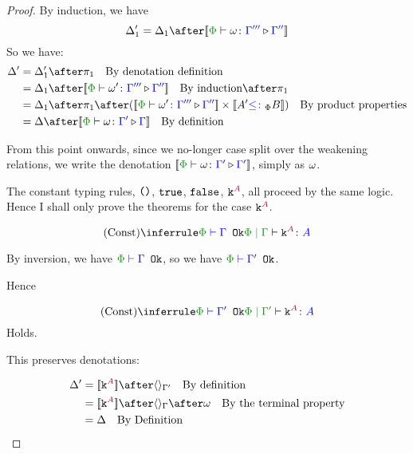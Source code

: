 \documentclass{report}
\begin{document}
\begin{framed}
\begin{proof}
                By induction, we have
                \begin{equation}
                    \D_1' = \D_1 \after \deno{\ewrel{\P}{\w}{\G'''}{\G''}}
                \end{equation}
                So we have:
                \begin{align*}
                    \D' &= \D_1' \after \p\qt{By denotation definition}\\
                    & = \D_1\after\deno{\ewrel{\P}{\w'}{\G'''}{\G''}}\qt{By induction}\after\p \\
                    & = \D_1\after\p\after(\deno{\ewrel{\P}{\w'}{\G'''}{\G''}}\times\deno{A' \subtypep B})\qt{By product properties}\\
                    & = \D\after\deno{\ewrel{\P}{\w}{\G'}{\G}}\qt{By definition}
                \end{align*}
        
        
            From this point onwards, since we no-longer case split over the weakening relations, we write the denotation $\deno{\ewrel{\P}{\w}{\G'}{\G'}}$, simply as $\omega$.
        
        
            \case{\vconst}
            The constant typing rules, $\texttt{()}$, $\texttt{true}$, $\texttt{false}$, $\texttt{k}^{\color{purple} A}$, all proceed by the same logic. Hence I shall only prove the theorems for the case $\texttt{k}^{\color{purple} A}$.
        
            \begin{equation}
                \ntreeruleI{\vconst}{\wellformedok{\P}{\G}}{\gpetyperelation{\const{A}}{A}}
            \end{equation}
        
            By inversion, we have $\wellformedok{\P}{\G}$, so we have $\wellformedok{\P}{\G'}$.
        
            Hence
        
            \begin{equation}
                \ntreeruleI{\vconst}{\wellformedok{\P}{\G'}}{\etyperelation{\P}{\G'}{\const{A}}{A}}
            \end{equation}
            Holds.
        
            This preserves denotations:
        
        
            \begin{align*}
                \D' & = \deno{\const{A}} \after \term{\G'}\qt{By definition}\\
                & = \deno{\const{A}} \after \term{\G}\after \w \qt{By the terminal property}\\
                & = \D\qt{By Definition}\\
            \end{align*}
        

\end{proof}
\end{framed}
\end{document}
